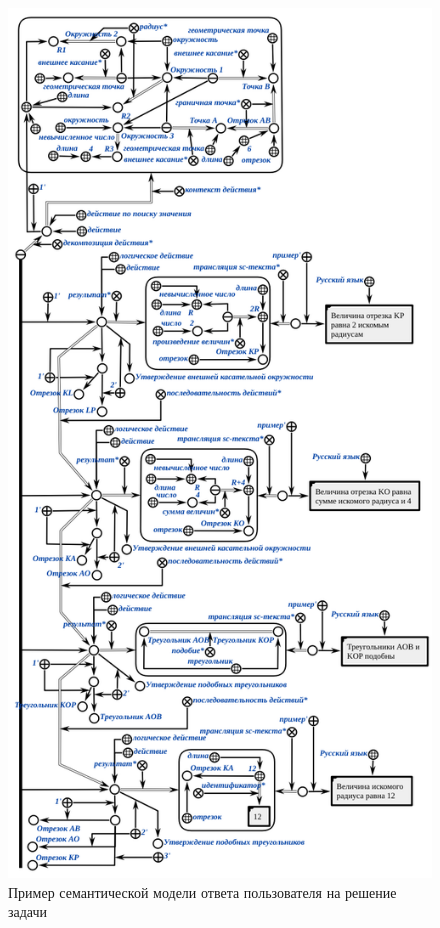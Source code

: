 \begin{figure}[H]
	\includegraphics[scale=0.7]{author/part7/figures/solving_task_example.png}
	\caption{Пример семантической модели ответа пользователя на решение задачи}
	\label{fig:STE_example}
\end{figure}

